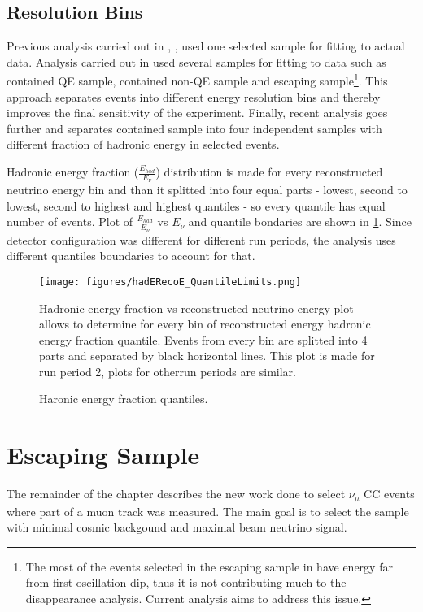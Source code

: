 \subsection{Resolution Bins}
Previous analysis carried out in \cite{Kanika}, \cite{Dominick}, \cite{Susan} used one selected sample for 
fitting to actual data. Analysis carried out in \cite{Nick} used several samples for fitting to data 
such as contained QE sample, contained non-QE sample and escaping sample\footnote{The most of the events 
selected in the escaping sample in \cite{Nick} have energy far from first oscillation dip, thus it is not 
contributing much to the disappearance analysis. Current analysis aims to address this issue.}. This 
approach separates events into different energy resolution bins and thereby improves the final sensitivity 
of the experiment. Finally, recent analysis \cite{Luke} goes further and separates contained sample into 
four independent samples with different fraction of hadronic energy in selected events. 

Hadronic energy fraction ($\frac{E_{had}}{E_\nu}$) distribution is made for every reconstructed neutrino energy
bin and than it splitted into four equal parts - lowest, second to lowest, second to highest and highest
quantiles - so every quantile has equal number of events. Plot of $\frac{E_{had}}{E_\nu}$ vs $E_\nu$ and 
quantile bondaries are shown in \ref{fig:hadE_Quant}. Since detector configuration was different for 
different run periods, the analysis uses different quantiles boundaries to account for that. 
\begin{figure}[h]
\centering
\texttt{[image: figures/hadERecoE\_QuantileLimits.png]}
\caption{Haronic energy fraction quantiles.}
{Hadronic energy fraction vs reconstructed neutrino energy plot allows to determine for every bin of
reconstructed energy hadronic energy fraction quantile. Events from every bin are splitted into 4 parts
and separated by black horizontal lines. This plot is made for run period 2, plots for otherrun periods 
are similar.}
\label{fig:hadE_Quant}
\end{figure}

\section{Escaping Sample} \label{esc_sec}
The remainder of the chapter describes the new work done to select $\nu_\mu$ CC events where part of 
a muon track was measured. The main goal is to select the sample with minimal cosmic backgound and maximal
beam neutrino signal.


